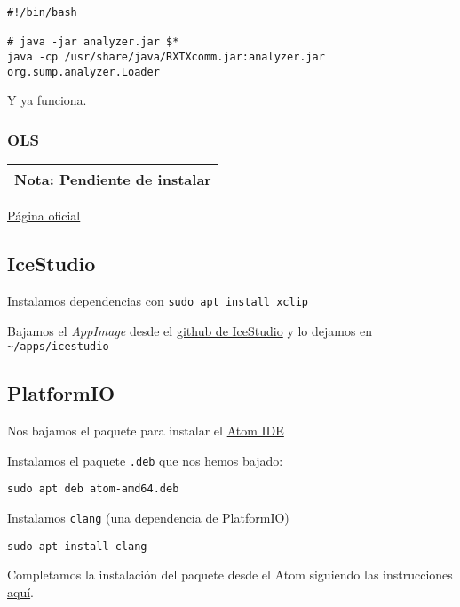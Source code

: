 \documentclass[
  12pt,
  spanish,
]{article}
\begin{document}
\begin{verbatim}
#!/bin/bash

# java -jar analyzer.jar $*
java -cp /usr/share/java/RXTXcomm.jar:analyzer.jar org.sump.analyzer.Loader
\end{verbatim}

Y ya funciona.

\hypertarget{ols}{%
\subsubsection{OLS}\label{ols}}

\begin{longtable}[]{@{}l@{}}
\toprule
\endhead
\textbf{Nota}: Pendiente de instalar\tabularnewline
\bottomrule
\end{longtable}

\href{https://www.lxtreme.nl/ols/}{Página oficial}

\hypertarget{icestudio}{%
\subsection{IceStudio}\label{icestudio}}

Instalamos dependencias con \texttt{sudo\ apt\ install\ xclip}

Bajamos el \emph{AppImage} desde el
\href{https://github.com/FPGAwars/icestudio}{github de IceStudio} y lo
dejamos en \texttt{\textasciitilde{}/apps/icestudio}

\hypertarget{platformio}{%
\subsection{PlatformIO}\label{platformio}}

Nos bajamos el paquete para instalar el \href{https://atom.io/}{Atom
IDE}

Instalamos el paquete \texttt{.deb} que nos hemos bajado:

\begin{verbatim}
sudo apt deb atom-amd64.deb
\end{verbatim}

Instalamos \texttt{clang} (una dependencia de PlatformIO)

\begin{verbatim}
sudo apt install clang
\end{verbatim}

Completamos la instalación del paquete desde el Atom siguiendo las
instrucciones
\href{https://platformio.org/get-started/ide?install=atom}{aquí}.
\end{document}
